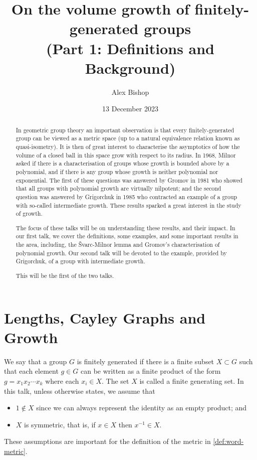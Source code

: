 \documentclass[11pt,a4paper,reqno]{amsart}
\theoremstyle{plain}
\theoremstyle{definition}
\theoremstyle{definition}
\begin{document}
\title{On the volume growth of finitely-generated groups\\(Part 1: Definitions and Background)}
\author{Alex Bishop}
\date{13 December 2023}
\address{%
	Section de mathématiques\\
	Université de Genève\\
	rue du Conseil-Général~7-9\\
	1205 Genève, Switzerland}

\begin{abstract}
In geometric group theory an important observation is that every finitely-generated group can be viewed as a metric space (up to a natural equivalence relation known as quasi-isometry). It is then of great interest to characterise the asymptotics of how the volume of a closed ball in this space grow with respect to its radius. In 1968, Milnor asked if there is a characterisation of groups whose growth is bounded above by a polynomial, and if there is any group whose growth is neither polynomial nor exponential. The first of these questions was answered by Gromov in 1981 who showed that all groups with polynomial growth are virtually nilpotent; and the second question was answered by Grigorchuk in 1985 who contracted an example of a group with so-called intermediate growth. These results sparked a great interest in the study of growth.

The focus of these talks will be on understanding these results, and their impact. In our first talk, we cover the definitions, some examples, and some important results in the area, including, the Švarc-Milnor lemma and Gromov's characterisation of polynomial growth. Our second talk will be devoted to the example, provided by Grigorchuk, of a group with intermediate growth.

This will be the first of the two talks.
\end{abstract}
\maketitle

\section{Lengths, Cayley Graphs and Growth}

We say that a group $G$ is finitely generated if there is a finite subset $X \subset G$ such that each element $g\in G$ can be written as a finite product of the form $g = x_1 x_2\cdots x_k$ where each $x_i\in X$.
The set $X$ is called a finite generating set.
In this talk, unless otherwise states, we assume that
\begin{itemize}
	\item $1\notin X$ since we can always represent the identity as an empty product; and
	\item $X$ is symmetric, that is, if $x \in X$ then $x^{-1} \in X$.
\end{itemize}
These assumptions are important for the definition of the metric in \cref{def:word-metric}.
\end{document}
